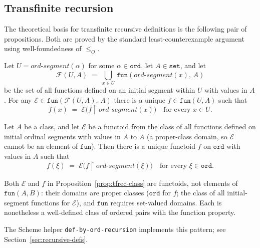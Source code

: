 \subsection{Transfinite recursion}
\label{sec:ord-recursion}

The theoretical basis for transfinite recursive definitions is the
following pair of propositions.  Both are proved by the standard
least-counterexample argument using well-foundedness of $\leq_O$.

\begin{sloppypar}
\begin{prop}\label{prop:tfrec-set}
Let $U = \mathit{ord\text{-}segment}(\alpha)$ for some $\alpha \in \mathtt{ord}$,
let $A \in \mathtt{set}$, and let
\[
  \mathcal{F}(U, A) \;=\; \bigcup_{x \in U}\,\mathtt{fun}(\mathit{ord\text{-}segment}(x),\, A)
\]
be the set of all functions defined on an initial segment within $U$ with
values in $A$.  For any $\mathcal{E} \in \mathtt{fun}(\mathcal{F}(U,A),\, A)$ there
is a unique $f \in \mathtt{fun}(U, A)$ such that
\[
  f(x) \;=\; \mathcal{E}\bigl(f \!\restriction\! \mathit{ord\text{-}segment}(x)\bigr)
  \quad \text{for every } x \in U.
\]
\end{prop}
\end{sloppypar}

\begin{prop}\label{prop:tfrec-class}
Let $A$ be a class, and let $\mathcal{E}$ be a functoid from the class of
all functions defined on initial ordinal segments with values in $A$ to $A$
(a proper-class domain, so $\mathcal{E}$ cannot be an element of
$\mathtt{fun}$).
Then there is a unique functoid $f$ on $\mathtt{ord}$ with values in $A$ such that
\[
  f(\xi) \;=\; \mathcal{E}\bigl(f \!\restriction\! \mathit{ord\text{-}segment}(\xi)\bigr)
  \quad \text{for every } \xi \in \mathtt{ord}.
\]
\end{prop}

\begin{remark}
Both $\mathcal{E}$ and $f$ in Proposition~\ref{prop:tfrec-class} are functoids, not
elements of $\mathtt{fun}(A,B)$: their domains are proper classes ($\mathtt{ord}$
for $f$; the class of all initial-segment functions for $\mathcal{E}$), and
$\mathtt{fun}$ requires set-valued domains.  Each is nonetheless a well-defined
class of ordered pairs with the function property.
\end{remark}

The Scheme helper \texttt{def-by-ord-recursion} implements this pattern;
see Section~\ref{sec:recursive-defs}.

